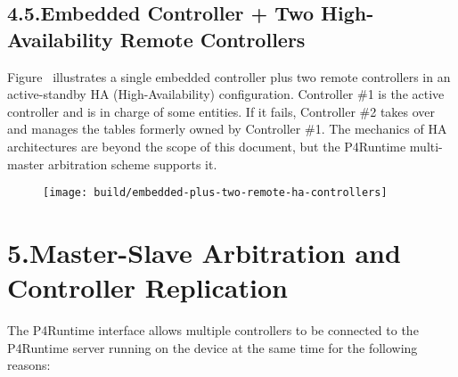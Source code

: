 \documentclass[11pt]{article}
\begin{document}
{%
\subsection{4.5.\hspace*{0.5em}Embedded Controller + Two High-Availability Remote Controllers}\label{sec-embedded-controller-two-high-availability-remote-controllers}%

\noindent{}Figure~ illustrates a single
embedded controller plus two remote controllers in an active-standby HA
(High-Availability) configuration. Controller \#1 is the active controller and is
in charge of some entities. If it fails, Controller \#2 takes over and manages
the tables formerly owned by Controller \#1. The mechanics of HA architectures
are beyond the scope of this document, but the P4Runtime multi-master
arbitration scheme supports it.%

\begin{figure}[tbp]%
\begin{mdcenter}%

\noindent{}\texttt{[image: build/embedded-plus-two-remote-ha-controllers]}{}%

\mdhr{}%

\noindent{}%
\end{mdcenter}\label{fig-embedded-plus-two-remote-ha-controllers}%
\end{figure}%

\section{5.\hspace*{0.5em}Master-Slave Arbitration and Controller Replication}\label{sec-master-slave-arbitration-and-controller-replication}%

\noindent{}The P4Runtime interface allows multiple controllers to be connected to the
P4Runtime server running on the device at the same time for the following
reasons:%

}
\end{document}
